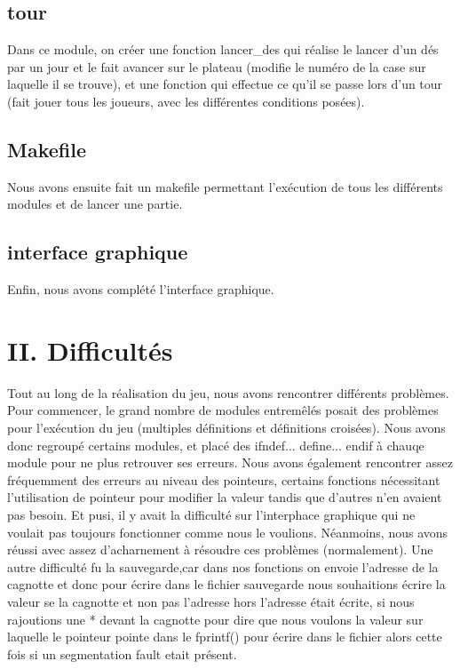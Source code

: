\documentclass[a4paper, 11pt]{report}
\begin{document}
\subsection{tour}
Dans ce module, on créer une fonction lancer\_des qui réalise le lancer d'un dés par un jour et le fait avancer sur le plateau (modifie le numéro de la case sur laquelle il se trouve), et une fonction qui effectue ce qu'il se passe lors d'un tour (fait jouer tous les joueurs, avec les différentes conditions posées).

\subsection{Makefile}
Nous avons ensuite fait un makefile permettant l'exécution de tous les différents modules et de lancer une partie.

\subsection{interface graphique}
Enfin, nous avons complété l'interface graphique.

\section{II. Difficultés}
Tout au long de la réalisation du jeu, nous avons rencontrer différents problèmes. Pour commencer, le grand nombre de modules entremêlés posait des problèmes pour l'exécution du jeu (multiples définitions et définitions croisées). Nous avons donc regroupé certains modules, et placé des ifndef... define... endif à chauqe module pour ne plus retrouver ses erreurs.
Nous avons également rencontrer assez fréquemment des erreurs au niveau des pointeurs, certains fonctions nécessitant l'utilisation de pointeur pour modifier la valeur tandis que d'autres n'en avaient pas besoin.
Et pusi, il y avait la difficulté sur l'interphace graphique qui ne voulait pas toujours fonctionner comme nous le voulions.
Néanmoins, nous avons réussi avec assez d'acharnement à résoudre ces problèmes (normalement).
Une autre difficulté fu la sauvegarde,car dans nos fonctions on envoie l'adresse de la cagnotte et donc pour écrire dans le fichier sauvegarde nous souhaitions écrire la valeur se la cagnotte et non pas l'adresse hors l'adresse était écrite, si nous rajoutions une * devant la cagnotte pour dire que nous voulons la valeur sur laquelle le pointeur pointe dans le fprintf() pour écrire dans le fichier alors cette fois si un segmentation fault etait présent.
\end{document}
